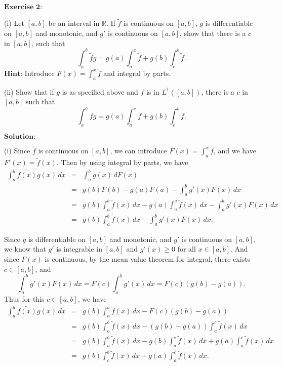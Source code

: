 \documentclass[12pt,a4paper]{ctexart}
\begin{document}
\newpage

$\underline{\textbf{Exercise 2:}}$

(i) Let $[a, b]$ be an interval in $\mathbb{R}$. If $\tilde{f}$ is continuous on $[a, b]$, $g$ is differentiable on $[a, b]$ and monotonic, and $g'$ is continuous on $[a, b]$, show that there is a $c$ in $[a, b]$, such that
\begin{equation*}
   \int_{a}^{b} \tilde{f}g = g(a) \int_{a}^{c} \tilde{f} + g(b) \int_{c}^{b} \tilde{f}.
\end{equation*}
$\textbf{Hint:}$ Introduce $F(x) = \int_{a}^{x} \tilde{f}$ and integral by parts.

(ii) Show that if $g$ is as specified above and $f$ is in $L^{1} ([a, b])$, there is a $c$ in $[a, b]$ such that 
\begin{equation*}
   \int_{a}^{b} f g = g(a) \int_{a}^{c} f + g(b) \int_{c}^{b} f.
\end{equation*}

\vspace{8pt}
$\textbf{Solution:}$

(i) Since $\tilde{f}$ is continuous on $[a, b]$, we can introduce $F(x) = \int_{a}^{x} \tilde{f}$, and we have $F'(x) = \tilde{f}(x)$. Then by using integral by parts, we have 
\begin{eqnarray*}
\int_{a}^{b} \tilde{f(x)} g(x) \, d x & = & \int_{a}^{b} g(x) \, d F(x) \\
& = & g(b) F(b) - g(a) F(a) - \int_{a}^{b} g'(x) F(x) \, d x  \\
& = & g(b) \int_{a}^{b} \tilde{f} (x) \, d x - g(a) \int_{a}^{a} \tilde{f} (x) \, d x - \int_{a}^{b} g'(x) F(x) \, d x  \\
& = &  g(b) \int_{a}^{b} \tilde{f} (x) \, d x - \int_{a}^{b} g'(x) F(x) \, d x.
\end{eqnarray*}

Since $g$ is differentiable on $[a, b]$ and monotonic, and $g'$ is continuous on $[a, b]$, we know that $g'$ is integrable in $[a, b]$ and $g'(x) \geq 0$ for all $x \in [a, b]$. And since $F(x)$ is continuous, by the mean value theorem for integral, there exists $c \in [a, b]$, and
\begin{equation*}
   \int_{a}^{b} g'(x) F(x) \, d x = F(c) \int_{a}^{b} g'(x) \, d x = F(c) (g(b) - g(a)).
\end{equation*}
Thus for this $c \in [a, b]$, we have
\begin{eqnarray*}
\int_{a}^{b} \tilde{f(x)} g(x) \, d x & = & g(b) \int_{a}^{b} \tilde{f} (x) \, d x - F(c) (g(b) - g(a)) \\
& = & g(b) \int_{a}^{b} \tilde{f} (x) \, d x - (g(b) - g(a)) \int_{a}^{c} \tilde{f} (x) \, d x \\
& = & g(b) \int_{a}^{b} \tilde{f} (x) \, d x - g(b) \int_{a}^{c} \tilde{f} (x) \, d x + g(a) \int_{a}^{c} \tilde{f} (x) \, d x  \\
& = &  g(b) \int_{c}^{b} \tilde{f} (x) \, d x + g(a) \int_{a}^{c} \tilde{f} (x) \, d x.
\end{eqnarray*}
\end{document}
